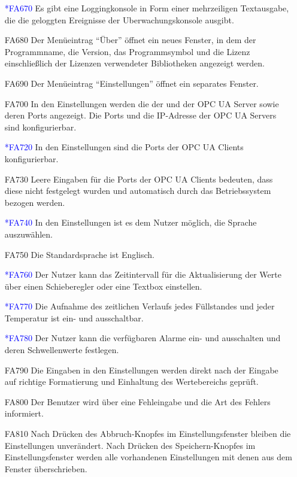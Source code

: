 \documentclass[parskip=full]{scrartcl}
\begin{document}
\begin{enumerate}
  \item[\textcolor{blue}{*FA670}] Es gibt eine Loggingkonsole in Form einer mehrzeiligen Textausgabe, die die geloggten Ereignisse der \gls{Uberwachungskonsole} ausgibt.
  \item[FA680] Der Menüeintrag "`Über"' öffnet ein neues Fenster, in dem der Programmname, die Version, das Programmsymbol und die Lizenz einschließlich der Lizenzen verwendeter Bibliotheken angezeigt werden.
  \item[FA690] Der Menüeintrag "`Einstellungen"' öffnet ein separates Fenster.
  \item[FA700] In den Einstellungen werden die  der  und der \gls{OPC UA Server} sowie deren Ports angezeigt. Die Ports und die IP-Adresse
  der \glspl{OPC UA Server} sind konfigurierbar.
  \item[\textcolor{blue}{*FA720}] In den Einstellungen sind die Ports der \glspl{OPC UA Client} konfigurierbar.
  \item[FA730] Leere Eingaben für die Ports der \glspl{OPC UA Client} bedeuten, dass diese nicht festgelegt wurden und automatisch durch das Betriebssystem bezogen werden.
  \item[\textcolor{blue}{*FA740}] In den Einstellungen ist es dem Nutzer möglich, die Sprache auszuwählen.
  \item[FA750] Die Standardsprache ist Englisch.
  \item[\textcolor{blue}{*FA760}] Der Nutzer kann das Zeitintervall für die Aktualisierung der Werte über einen Schieberegler oder eine Textbox einstellen.
  \item[\textcolor{blue}{*FA770}] Die Aufnahme des zeitlichen Verlaufs jedes Füllstandes und jeder Temperatur ist ein- und ausschaltbar.
  \item[\textcolor{blue}{*FA780}] Der Nutzer kann die verfügbaren Alarme ein- und ausschalten und deren Schwellenwerte festlegen.
  \item[FA790] Die Eingaben in den Einstellungen werden direkt nach der Eingabe auf richtige Formatierung und Einhaltung des Wertebereichs gepr\"uft.
  \item[FA800] Der Benutzer wird über eine Fehleingabe und die Art des Fehlers informiert.
  \item[FA810] Nach Drücken des Abbruch-Knopfes im Einstellungsfenster bleiben die Einstellungen unverändert. Nach Drücken des Speichern-Knopfes im Einstellungsfenster werden alle vorhandenen
  Einstellungen mit denen aus dem Fenster überschrieben.

\end{enumerate}
\end{document}
